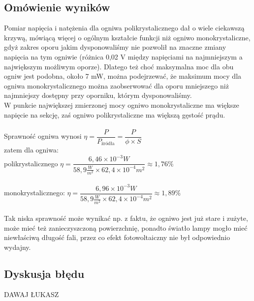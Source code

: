 \documentclass[12pt,a4paper]{article}
\begin{document}
\newpage

\subsection{Omówienie wyników}
Pomiar napięcia i natężenia dla ogniwa polikrystalicznego dał o wiele ciekawszą krzywą, mówiącą więcej o ogólnym kształcie funkcji niż ogniwo monokrystaliczne, gdyż zakres oporu jakim dysponowaliśmy nie pozwolił na znaczne zmiany napięcia na tym ogniwie (różnica 0,02 V między napięciami na najmniejszym a największym możliwym oporze). Dlatego też choć maksymalna moc dla obu ogniw jest podobna, około 7 mW, można podejrzewać, że maksimum mocy dla ogniwa monokrystalicznego można zaobserwować dla oporu mniejszego niż najmniejszy dostępny przy oporniku, którym dysponowaliśmy. \\
W punkcie największej zmierzonej mocy ogniwo monokrystaliczne ma większe napięcie na sekcję, zaś ogniwo polikrystaliczne ma większą gęstość prądu.\\\\
Sprawność ogniwa wynosi 
$\eta = \dfrac{P}{P_{\text{źródła}}} = \dfrac{P}{\phi \times S}$ \\
zatem dla ogniwa:\\
polikrystalicznego 
$\eta = \dfrac{6,46 \times 10^{-3} W}{58,9 \frac{W}{m^2} \times 62,4 \times 10^{-4} m^2} \approx 1,76 \%$ \\\\
monokrystalicznego: 
$\eta = \dfrac{6,96 \times 10^{-3} W}{58,9 \frac{W}{m^2} \times 62,4 \times 10^{-4} m^2} \approx 1,89\% $  \\\\
Tak niska sprawność może wynikać np. z faktu, że ogniwo jest już stare i zużyte, może mieć też zanieczyszczoną powierzchnię, ponadto światło lampy mogło mieć niewłaściwą długość fali, przez co efekt fotowoltaiczny nie był odpowiednio wydajny.%

\subsection{Dyskusja błędu}
\begin{Huge}
DAWAJ ŁUKASZ
\end{Huge}
\end{document}
